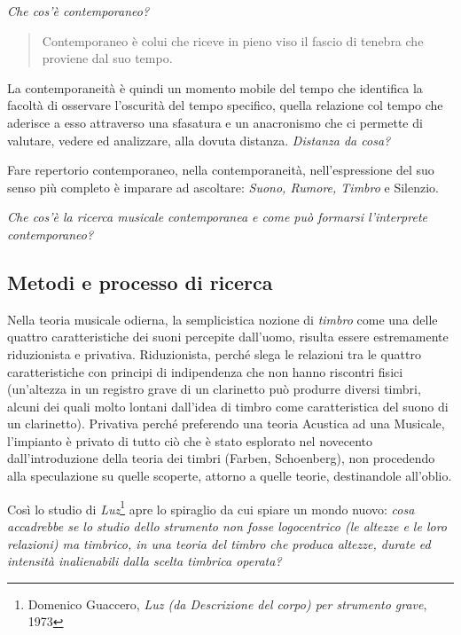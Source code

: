 \documentclass{gs-adonis}
\begin{document}
\emph{Che cos'è contemporaneo?}

\begin{quote}
  Contemporaneo è colui che riceve in pieno viso il fascio di tenebra che proviene dal suo tempo. \cite{agamben2008che}
\end{quote}

La contemporaneità è quindi un momento mobile del tempo che identifica la
facoltà di osservare l’oscurità del tempo specifico, quella relazione col
tempo che aderisce a esso attraverso una sfasatura e un anacronismo che ci
permette di valutare, vedere ed analizzare, alla dovuta distanza. \emph{Distanza da
cosa?}

Fare repertorio contemporaneo, nella contemporaneità, nell’espressione del suo
senso più completo è imparare ad ascoltare: \emph{Suono, Rumore, Timbro} e Silenzio.

\emph{Che cos'è la ricerca musicale contemporanea e come può formarsi l'interprete contemporaneo?}
\subsection{Metodi e processo di ricerca}%

Nella teoria musicale odierna, la semplicistica nozione di \emph{timbro} come
una delle quattro caratteristiche dei suoni percepite dall'uomo, risulta essere
estremamente riduzionista e privativa. Riduzionista, perché slega le relazioni
tra le quattro caratteristiche con principi di indipendenza che non hanno
riscontri fisici (un'altezza in un registro grave di un clarinetto può produrre
diversi timbri, alcuni dei quali molto lontani dall'idea di timbro come
caratteristica del suono di un clarinetto). Privativa perché preferendo una
teoria Acustica ad una Musicale, l'impianto è privato di tutto ciò che è stato
esplorato nel novecento dall'introduzione della teoria dei timbri (Farben, Schoenberg),
non procedendo alla speculazione su quelle scoperte, attorno a quelle teorie,
destinandole all'oblio.

Così lo studio di \emph{Luz}\footnote{%
Domenico Guaccero, \emph{Luz (da Descrizione del corpo) per strumento grave}, 1973
} apre lo spiraglio da cui spiare un mondo nuovo: \emph{cosa accadrebbe se lo
studio dello strumento non fosse logocentrico (le altezze e le loro relazioni)
ma timbrico, in una teoria del timbro che produca altezze, durate ed intensità
inalienabili dalla scelta timbrica operata?}
\end{document}

